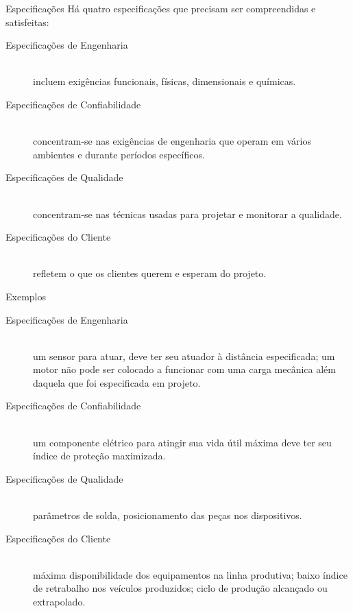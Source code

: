 \documentclass[aspectratio=169]{beamer}
\begin{document}
\begin{frame}[t]{Especificações}
    Há quatro especificações que precisam ser compreendidas e satisfeitas:
    \vspace{.2cm}
    \begin{description}%
        \item[Especificações de Engenharia] \hfill \\ incluem exigências funcionais, físicas, dimensionais e químicas.
        \item[Especificações de Confiabilidade] \hfill \\ concentram-se nas exigências de engenharia que operam em vários ambientes e durante períodos específicos.
        \item[Especificações de Qualidade] \hfill \\ concentram-se nas técnicas usadas para projetar e monitorar a qualidade.
        \item[Especificações do Cliente] \hfill \\ refletem o que os clientes querem e esperam do projeto.
    \end{description}
\end{frame}
\begin{frame}[t]{Exemplos}
    \begin{description}%
        \item[Especificações de Engenharia] \hfill \\ um sensor para atuar, deve ter seu atuador à distância especificada; um motor não pode ser colocado a funcionar com uma carga mecânica além daquela que foi especificada em projeto.
        \item[Especificações de Confiabilidade] \hfill \\ um componente elétrico para atingir sua vida útil máxima deve ter seu índice de proteção maximizada.
        \item[Especificações de Qualidade] \hfill \\ parâmetros de solda, posicionamento das peças nos dispositivos.
        \item[Especificações do Cliente] \hfill \\ máxima disponibilidade dos equipamentos na linha produtiva; baixo índice de retrabalho nos veículos produzidos; ciclo de produção alcançado ou extrapolado.
    \end{description}
\end{frame}
\end{document}
